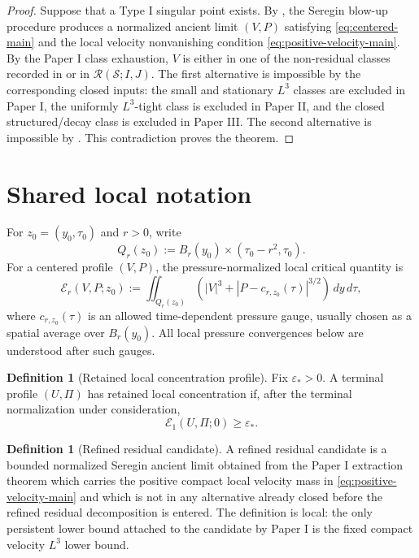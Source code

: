 \documentclass[11pt]{amsart}
\numberwithin{equation}{section}
\theoremstyle{plain}
\theoremstyle{definition}
\newtheorem{definition}[theorem]{Definition}
\theoremstyle{remark}
\newcommand{\eps}{\varepsilon}
\newcommand{\calS}{\mathcal S}
\newcommand{\calR}{\mathcal R}
\newcommand{\calE}{\mathcal E}
\begin{document}
\begin{proof}
Suppose that a Type I singular point exists.  By
, the Seregin blow-up procedure produces a
normalized ancient limit \((V,P)\) satisfying \eqref{eq:centered-main} and the
local velocity nonvanishing condition \eqref{eq:positive-velocity-main}.  By
the Paper I class exhaustion, \(V\) is either in one of the non-residual
classes recorded in  or in
\(\calR(\calS;I,J)\).  The first alternative is impossible by the corresponding
closed inputs: the small and stationary \(L^3\) classes are excluded in Paper I,
the uniformly \(L^3\)-tight class is excluded in Paper II, and the closed
structured/decay class is excluded in Paper III.  The second alternative is
impossible by .  This contradiction proves
the theorem.
\end{proof}

\section{Shared local notation}
\label{sec:shared-notation}

For \(z_0=(y_0,\tau_0)\) and \(r>0\), write
\[
   Q_r(z_0):=B_r(y_0)\times(\tau_0-r^2,\tau_0).
\]
For a centered profile \((V,P)\), the pressure-normalized local critical
quantity is
\begin{equation}\label{eq:local-energy-main}
   \calE_r(V,P;z_0)
   :=
   \iint_{Q_r(z_0)}
   \left(|V|^3+|P-c_{r,z_0}(\tau)|^{3/2}\right)\,dy\,d\tau,
\end{equation}
where \(c_{r,z_0}(\tau)\) is an allowed time-dependent pressure gauge, usually
chosen as a spatial average over \(B_r(y_0)\).  All local pressure
convergences below are understood after such gauges.

\begin{definition}[Retained local concentration profile]
\label{def:retained-active-main}
Fix \(\eps_*>0\).  A terminal profile \((U,\Pi)\) has retained local
concentration if, after the terminal normalization under consideration,
\[
   \calE_1(U,\Pi;0)\ge \eps_* .
\]
\end{definition}

\begin{definition}[Refined residual candidate]
\label{def:refined-residual-candidate}
A refined residual candidate is a bounded normalized Seregin ancient limit
obtained from the Paper I extraction theorem which carries the positive compact local
velocity mass in \eqref{eq:positive-velocity-main} and which is not in any alternative
already closed before the refined residual decomposition is entered.  The definition is local:
the only persistent lower bound attached to the candidate by Paper I is the
fixed compact velocity \(L^3\) lower bound.
\end{definition}
\end{document}
